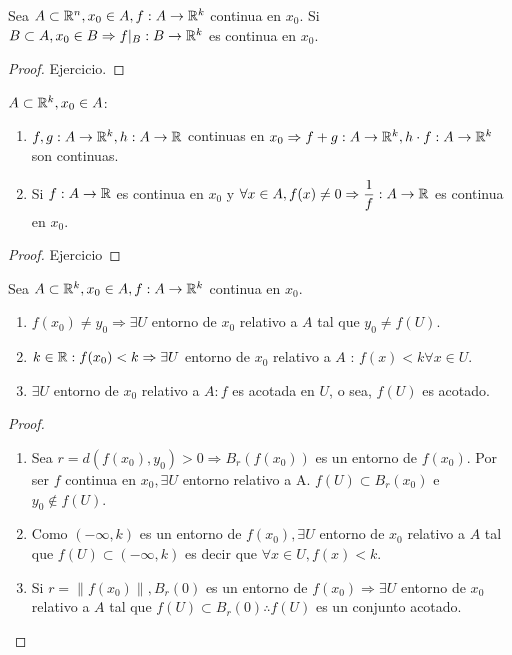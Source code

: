 \begin{prop}
  Sea $A \subset \mathbb{R}^n, x_0 \in A, f: A \to \mathbb{R}^k$ continua en $x_0$. Si $B \subset A, x_0 \in B \Rightarrow f|_B: B \to \mathbb{R}^k$ es continua en $x_0$.
  \begin{proof}
    Ejercicio.
  \end{proof}
\end{prop}

\begin{prop}
  $A \subset \mathbb{R}^k, x_0 \in A$:
  \begin{enumerate}
    \item $f, g: A \to \mathbb{R}^k, h: A \to \mathbb{R}$ continuas en $x_0 \Rightarrow f+g: A \to \mathbb{R}^k, h \cdot f: A \to \mathbb{R}^k$ son continuas.
    \item Si $f: A \to \mathbb{R}$ es continua en $x_0$ y $\forall x \in A, f(x) \neq 0 \Rightarrow \dfrac{1}{f}: A \to \mathbb{R}$ es continua en $x_0$.
  \end{enumerate}

  \begin{proof}
    Ejercicio
  \end{proof}
\end{prop}

\begin{prop}
  Sea $A \subset \mathbb{R}^k, x_0 \in A, f: A \to \mathbb{R}^k$ continua en $x_0$.
  \begin{enumerate}
    \item $f(x_0) \neq y_0 \Rightarrow \exists U$ entorno de $x_0$ relativo a $A$ tal que $y_0 \neq f(U)$.
    \item $k \in \mathbb{R} : f(x_0) < k \Rightarrow \exists U$ entorno de $x_0$ relativo a $A$ : $f(x) < k \forall x \in U$.
    \item $\exists U$ entorno de $x_0$ relativo a $A : f$ es acotada en $U$, o sea, $f(U)$ es acotado.
  \end{enumerate}

  \begin{proof}
    \begin{enumerate}
      \item Sea $r = d(f(x_0), y_0) > 0 \Rightarrow B_r(f(x_0))$ es un entorno de $f(x_0)$. Por ser $f$ continua en $x_0, \exists U$ entorno relativo a A. $f(U) \subset B_r(x_0)$ e $y_0 \notin f(U)$.
      \item Como $(-\infty, k)$ es un entorno de $f(x_0), \exists U$ entorno de $x_0$ relativo a $A$ tal que $f(U) \subset (-\infty, k)$ es decir que $\forall x \in U, f(x) < k$.
      \item Si $r = \|f(x_0)\|, B_r(0)$ es un entorno de $f(x_0) \Rightarrow \exists U$ entorno de $x_0$ relativo a $A$ tal que $f(U) \subset B_r(0) \therefore f(U)$ es un conjunto acotado.
    \end{enumerate}
  \end{proof}
\end{prop}

